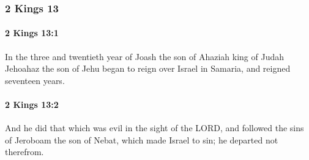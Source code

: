 	\subsubsection{2 Kings 13} %
		\label{2KINGS-13}

		\paragraph{2 Kings 13:1} %
			\label{2KINGS-13-1}

			In the three and twentieth year of Joash the son of Ahaziah king of Judah Jehoahaz the son of Jehu began to reign over Israel in Samaria, and reigned seventeen years.


		\paragraph{2 Kings 13:2} %
			\label{2KINGS-13-2}

			And he did that which was evil in the sight of the LORD, and followed the sins of Jeroboam the son of Nebat, which made Israel to sin; he departed not therefrom.

